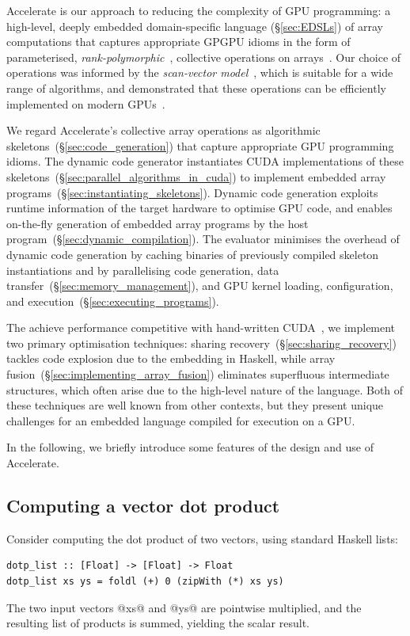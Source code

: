 Accelerate is our approach to reducing the complexity of GPU programming: a
high-level, deeply embedded domain-specific language (\S\ref{sec:EDSLs}) of
array computations that captures appropriate GPGPU idioms in the form of
parameterised, \emph{rank-polymorphic}~\cite{Keller:2010er}, collective
operations on arrays~\cite{Chakravarty:2011fr}. Our choice of operations was
informed by the \emph{scan-vector model}~\cite{Chatterjee:1990vj}, which is
suitable for a wide range of algorithms, and demonstrated that these operations
can be efficiently implemented on modern GPUs~\cite{Sengupta:2007tc}.

We regard Accelerate's collective array operations as algorithmic
skeletons~(\S\ref{sec:code_generation}) that capture appropriate GPU programming
idioms. The dynamic code generator instantiates CUDA implementations of these
skeletons~(\S\ref{sec:parallel_algorithms_in_cuda}) to implement embedded array
programs~(\S\ref{sec:instantiating_skeletons}). Dynamic code generation exploits
runtime information of the target hardware to optimise GPU code, and enables
on-the-fly generation of embedded array programs by the host
program~(\S\ref{sec:dynamic_compilation}). The evaluator minimises the overhead
of dynamic code generation by caching binaries of previously compiled skeleton
instantiations and by parallelising code generation, data
transfer~(\S\ref{sec:memory_management}), and GPU kernel loading, configuration,
and execution~(\S\ref{sec:executing_programs}).

The achieve performance competitive with hand-written
CUDA~\cite{McDonell:2013wi}, we implement two primary optimisation techniques:
sharing recovery~(\S\ref{sec:sharing_recovery}) tackles code explosion due to
the embedding in Haskell, while array
fusion~(\S\ref{sec:implementing_array_fusion}) eliminates superfluous
intermediate structures, which often arise due to the high-level nature of the
language. Both of these techniques are well known from other contexts, but they
present unique challenges for an embedded language compiled for execution on a
GPU.

In the following, we briefly introduce some features of the design and use of
Accelerate.


\subsection{Computing a vector dot product}
\label{sec:computing_dotp}

Consider computing the dot product of two vectors, using standard Haskell lists:
%
\begin{lstlisting}[style=haskell]
dotp_list :: [Float] -> [Float] -> Float
dotp_list xs ys = foldl (+) 0 (zipWith (*) xs ys)
\end{lstlisting}
%
The two input vectors @xs@ and @ys@ are pointwise multiplied, and the resulting
list of products is summed, yielding the scalar result.

